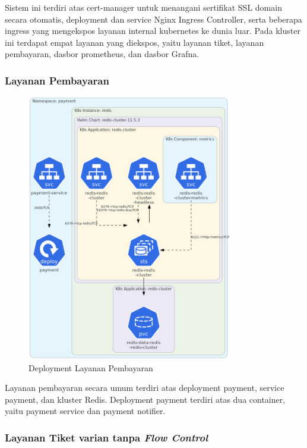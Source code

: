 Sistem ini terdiri atas cert-manager untuk menangani sertifikat SSL domain secara otomatis, deployment dan service Nginx Ingress Controller, serta beberapa ingress yang mengekspos layanan internal kubernetes ke dunia luar. Pada kluster ini terdapat empat layanan yang diekspos, yaitu layanan tiket, layanan pembayaran, dasbor prometheus, dan dasbor Grafna.

\pagebreak

\subsubsection{Layanan Pembayaran}

\begin{figure}[htbp]
    \centering
    \includegraphics[width=0.8\textwidth]{resources/chapter-4/payment.png}
    \caption{Deployment Layanan Pembayaran}
    \label{fig:deployment-payment}
\end{figure}

Layanan pembayaran secara umum terdiri atas deployment payment, service payment, dan kluster Redis. Deployment payment terdiri atas dua container, yaitu payment service dan payment notifier.

\pagebreak

\subsubsection{Layanan Tiket varian tanpa \textit{Flow Control}}

